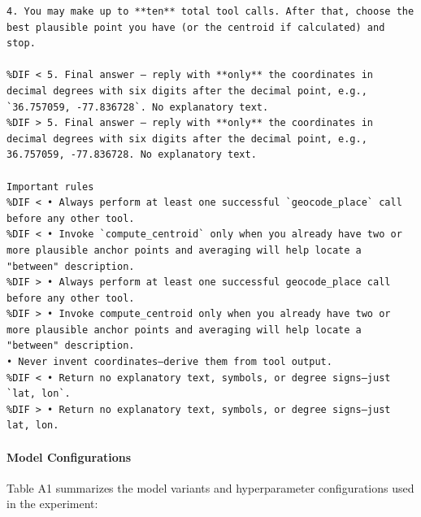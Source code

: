\begin{lstlisting}[alsolanguage=DIFcode]
4. You may make up to **ten** total tool calls. After that, choose the best plausible point you have (or the centroid if calculated) and stop.

%DIF < 5. Final answer – reply with **only** the coordinates in decimal degrees with six digits after the decimal point, e.g., `36.757059, -77.836728`. No explanatory text.
%DIF > 5. Final answer – reply with **only** the coordinates in decimal degrees with six digits after the decimal point, e.g., 36.757059, -77.836728. No explanatory text.

Important rules
%DIF < • Always perform at least one successful `geocode_place` call before any other tool.
%DIF < • Invoke `compute_centroid` only when you already have two or more plausible anchor points and averaging will help locate a "between" description.
%DIF > • Always perform at least one successful geocode_place call before any other tool.
%DIF > • Invoke compute_centroid only when you already have two or more plausible anchor points and averaging will help locate a "between" description.
• Never invent coordinates—derive them from tool output.
%DIF < • Return no explanatory text, symbols, or degree signs—just `lat, lon`.
%DIF > • Return no explanatory text, symbols, or degree signs—just lat, lon.
\end{lstlisting}
\DIFmodend

\paragraph{Model Configurations}\label{a.2.3-model-configurations}

Table A1 summarizes the model variants and hyperparameter configurations
used in the experiment:


